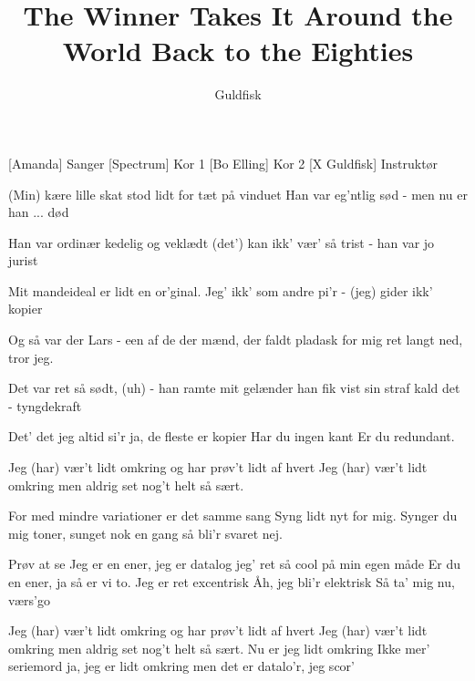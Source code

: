 \documentclass[a4paper,11pt]{article}
\title{The Winner Takes It Around the World Back to the Eighties}
\author{Guldfisk}
\begin{document}
  \maketitle

  \begin{roles}
  [Amanda] Sanger
  [Spectrum] Kor 1
  [Bo Elling] Kor 2
  [X Guldfisk] Instruktør
  \end{roles}

  \begin{song}
      (Min) kære lille skat
      stod lidt for tæt på vinduet
      Han var eg’ntlig sød
      - men nu er han ... død

      Han var ordinær
      kedelig og veklædt
      (det’) kan ikk’ vær’ så trist
      - han var jo jurist

      Mit mandeideal
      er lidt en or’ginal.
      Jeg' ikk’ som andre pi’r
      - (jeg) gider ikk’ kopier

      Og så var der Lars
      - een af de der mænd, der
      faldt pladask for mig
      ret langt ned, tror jeg.

      Det var ret så sødt,
      (uh) - han ramte mit gelænder
      han fik vist sin straf
      kald det - tyngdekraft

      Det' det jeg altid si’r
      ja, de fleste er kopier
      Har du ingen kant
      Er du redundant.

      Jeg (har) vær’t lidt omkring
      og har prøv’t lidt af hvert
      Jeg (har) vær’t lidt omkring
      men aldrig set nog’t helt så sært.

      For med mindre variationer 
      er det samme sang
      Syng lidt nyt for mig.
      Synger du mig toner, 
      sunget nok en gang
      så bli’r svaret nej.

     Prøv at se
     Jeg er en ener, jeg er datalog
      jeg' ret så cool på min egen måde
      Er du en ener, ja så er vi to.
      Jeg er ret excentrisk
     Åh, jeg bli’r elektrisk
     Så ta’ mig nu, værs’go

      Jeg (har) vær’t lidt omkring
      og har prøv’t lidt af hvert
      Jeg (har) vær’t lidt omkring
      men aldrig set nog’t helt så sært.
      Nu er jeg lidt omkring
      Ikke mer’ seriemord
      ja, jeg er lidt omkring
      men det er datalo’r, jeg scor’


\end{song}
\end{document}
